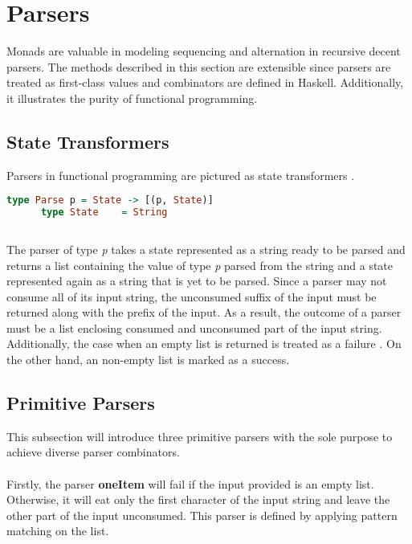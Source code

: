 \documentclass[a4paper, onecolumn]{article}
\begin{document}
    \section{Parsers}
    Monads are valuable in modeling sequencing and alternation in recursive decent parsers. The methods described in this section are extensible since parsers are treated as first-class values and combinators are defined in Haskell. Additionally, it illustrates the purity of functional programming.
    
    \subsection{State Transformers}
    
    Parsers in functional programming are pictured as state transformers \cite{original}.  
    
    \begin{tcolorbox}
      \begin{lstlisting}[language=Haskell]
      type Parse p = State -> [(p, State)]
      type State    = String  
      
      \end{lstlisting}
    \end{tcolorbox}
    
    \noindent The parser of type \textit{p} takes a state represented as a string ready to be parsed and returns a list containing the value of type \textit{p} parsed from the string and a state represented again as a string that is yet to be parsed. Since a parser may not consume all of its input string, the unconsumed suffix of the input must be returned along with the prefix of the input. As a result, the outcome of a parser must be a list enclosing consumed and unconsumed part of the input string. Additionally, the case when an empty list is returned is treated as a failure \cite{pearls}. On the other hand, an non-empty list is marked as a success.
    
    \subsection{Primitive Parsers}
    
    This subsection will introduce three primitive parsers with the sole purpose to achieve diverse parser combinators. \\ \\
    Firstly, the parser \textbf{oneItem} will fail if the input provided is an empty list. Otherwise, it will eat only the first character of the input string and leave the other part of the input unconsumed. This parser is defined by applying pattern matching on the list. 
     
\end{document}
